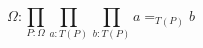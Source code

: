 \begin{equation}\label{eq:prop_type}
    \Omega : \prod _{P : \Omega} \prod_{a: T(P)} \prod_{b: T(P)} a =_{T(P)} b
\end{equation}
